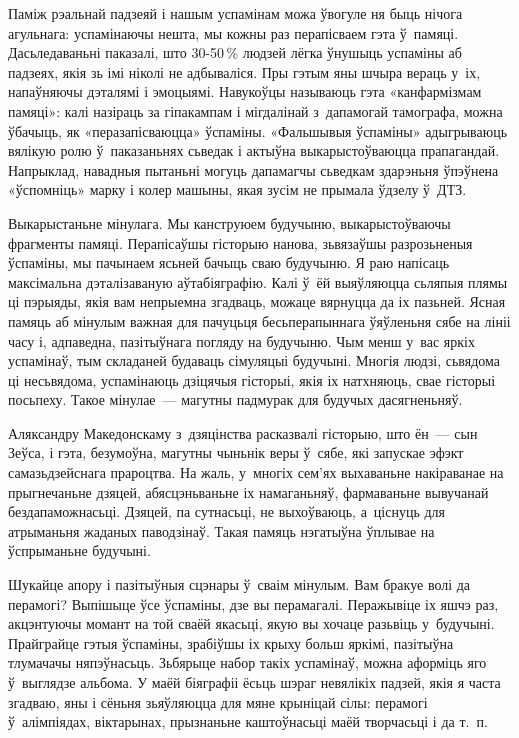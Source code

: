 Паміж рэальнай падзеяй і нашым успамінам можа ўвогуле ня быць нічога агульнага: успамінаючы нешта, мы кожны раз перапісваем гэта ў~памяці. Дасьледаваньні паказалі, што 30-50\,\% людзей лёгка ўнушыць успаміны аб падзеях, якія зь імі ніколі не адбываліся. Пры гэтым яны шчыра вераць у~іх, напаўняючы дэталямі і эмоцыямі. Навукоўцы называюць гэта «канфармізмам памяці»: калі назіраць за гіпакампам і мігдалінай з~дапамогай тамографа, можна ўбачыць, як «перазапісваюцца» ўспаміны. «Фальшывыя ўспаміны» адыгрываюць вялікую ролю ў~паказаньнях сьведак і актыўна выкарыстоўваюцца прапагандай. Напрыклад, навадныя пытаньні могуць дапамагчы сьведкам здарэньня ўпэўнена «ўспомніць» марку і колер машыны, якая зусім не прымала ўдзелу ў~ДТЗ.

Выкарыстаньне мінулага. Мы канструюем будучыню, выкарыстоўваючы фрагменты памяці. Перапісаўшы гісторыю нанова, зьвязаўшы разрозьненыя ўспаміны, мы пачынаем ясьней бачыць сваю будучыню. Я раю напісаць максімальна дэталізаваную аўтабіяграфію. Калі ў~ёй выяўляюцца сьляпыя плямы ці пэрыяды, якія вам непрыемна згадваць, можаце вярнуцца да іх пазьней. Ясная памяць аб мінулым важная для пачуцьця бесьперапыннага ўяўленьня сябе на лініі часу і, адпаведна, пазітыўнага погляду на будучыню. Чым менш у~вас яркіх успамінаў, тым складаней будаваць сімуляцыі будучыні. Многія людзі, сьвядома ці несьвядома, успамінаюць дзіцячыя гісторыі, якія іх натхняюць, свае гісторыі посьпеху. Такое мінулае~--- магутны падмурак для будучых дасягненьняў.

Аляксандру Македонскаму з~дзяцінства расказвалі гісторыю, што ён~--- сын Зеўса, і гэта, безумоўна, магутны чыньнік веры ў~сябе, які запускае эфэкт самазьдзейснага прароцтва. На жаль, у~многіх сем'ях выхаваньне накіраванае на прыгнечаньне дзяцей, абясцэньваньне іх намаганьняў, фармаваньне вывучанай бездапаможнасьці. Дзяцей, па сутнасьці, не выхоўваюць, а~ціснуць для атрыманьня жаданых паводзінаў. Такая памяць нэгатыўна ўплывае на ўспрыманьне будучыні.

Шукайце апору і пазітыўныя сцэнары ў~сваім мінулым. Вам бракуе волі да перамогі? Выпішыце ўсе ўспаміны, дзе вы перамагалі. Перажывіце іх яшчэ раз, акцэнтуючы момант на той сваёй якасьці, якую вы хочаце разьвіць у~будучыні. Прайграйце гэтыя ўспаміны, зрабіўшы іх крыху больш яркімі, пазітыўна тлумачачы няпэўнасьць. Зьбярыце набор такіх успамінаў, можна аформіць яго ў~выглядзе альбома. У маёй біяграфіі ёсьць шэраг невялікіх падзей, якія я часта згадваю, яны і сёньня зьяўляюцца для мяне крыніцай сілы: перамогі ў~алімпіядах, віктарынах, прызнаньне каштоўнасьці маёй творчасьці і да т.~п.

